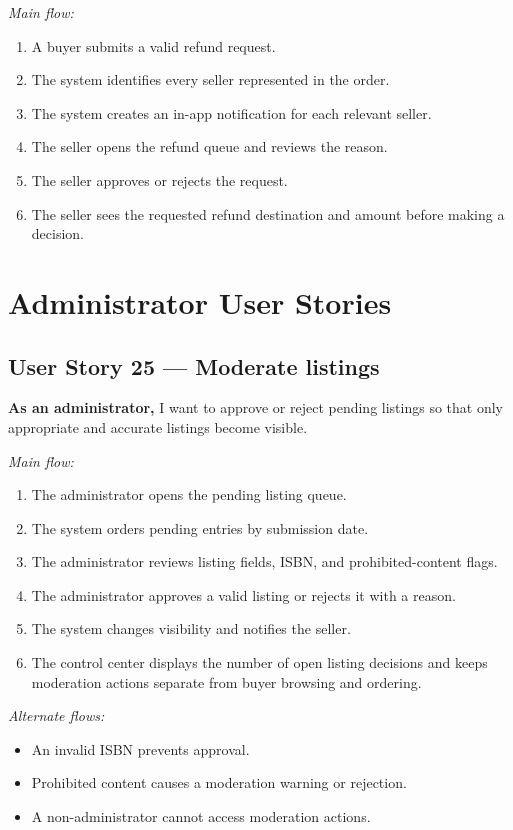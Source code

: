 \documentclass[11pt]{scrreprt}
\begin{document}
\textit{Main flow:}
\begin{enumerate}
\item A buyer submits a valid refund request.
\item The system identifies every seller represented in the order.
\item The system creates an in-app notification for each relevant seller.
\item The seller opens the refund queue and reviews the reason.
\item The seller approves or rejects the request.
\item The seller sees the requested refund destination and amount before
making a decision.
\end{enumerate}

\section{Administrator User Stories}

\subsection{User Story 25 --- Moderate listings}
\textbf{As an administrator,} I want to approve or reject pending listings so
that only appropriate and accurate listings become visible.

\textit{Main flow:}
\begin{enumerate}
\item The administrator opens the pending listing queue.
\item The system orders pending entries by submission date.
\item The administrator reviews listing fields, ISBN, and prohibited-content
flags.
\item The administrator approves a valid listing or rejects it with a reason.
\item The system changes visibility and notifies the seller.
\item The control center displays the number of open listing decisions and
keeps moderation actions separate from buyer browsing and ordering.
\end{enumerate}

\textit{Alternate flows:}
\begin{itemize}
\item An invalid ISBN prevents approval.
\item Prohibited content causes a moderation warning or rejection.
\item A non-administrator cannot access moderation actions.
\end{itemize}
\end{document}
